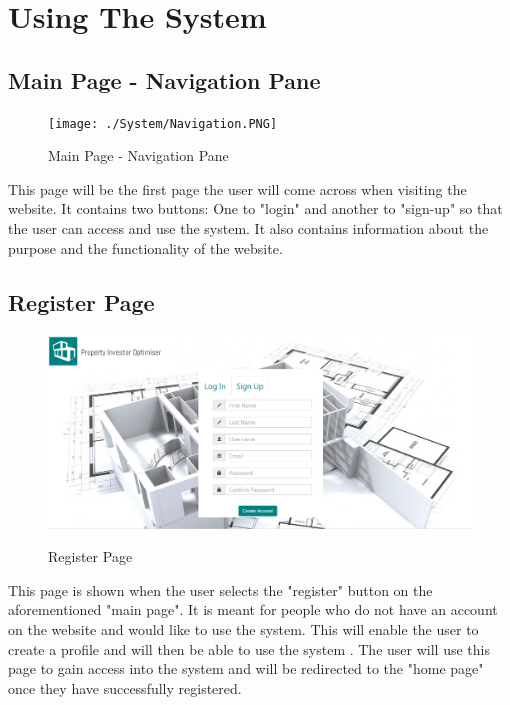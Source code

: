\documentclass[a4paper,12pt]{article}
\begin{document}
\newpage

\section{Using The System}

 
\subsection{Main Page - Navigation Pane}
	\begin{figure}[H]
		\texttt{[image: ./System/Navigation.PNG]}\\[0.4cm]  
		\caption{Main Page - Navigation Pane}
	\end{figure}
This page will be the first page the user will come across when visiting the website. It contains two buttons: One to "login" and another to "sign-up" so that the user can access and use the system. It also contains information about the purpose and the functionality of the website.

\subsection{Register Page}
	\begin{figure}[H]
		\includegraphics[width=0.9\linewidth, center]{./System/Register.PNG}\\[0.4cm]  
		\caption{Register Page}
	\end{figure}
This page is shown when the user selects the "register" button on the aforementioned "main page". It is meant for people who do not have an account on the website and would like to use the system. This will enable the user to create a profile and will then be able to use the system . The user will use this page to gain access into the system and will be redirected to the "home page" once they have successfully registered.
\end{document}
